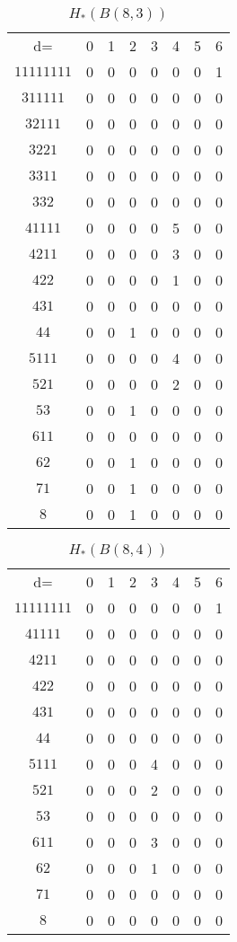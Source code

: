 \documentclass{amsart}
\begin{document}
\begin{table}
\begin{tabular}{cccccccc}
d=         & 0 & 1 & 2 & 3 & 4 & 5 & 6  \\
$11111111$ & 0 & 0 & 0 & 0 & 0 & 0 & 1  \\
$311111$   & 0 & 0 & 0 & 0 & 0 & 0 & 0  \\
$32111$    & 0 & 0 & 0 & 0 & 0 & 0 & 0  \\
$3221$     & 0 & 0 & 0 & 0 & 0 & 0 & 0  \\
$3311$     & 0 & 0 & 0 & 0 & 0 & 0 & 0  \\
$332$      & 0 & 0 & 0 & 0 & 0 & 0 & 0  \\
$41111$    & 0 & 0 & 0 & 0 & 5 & 0 & 0  \\
$4211$     & 0 & 0 & 0 & 0 & 3 & 0 & 0  \\
$422$      & 0 & 0 & 0 & 0 & 1 & 0 & 0  \\
$431$      & 0 & 0 & 0 & 0 & 0 & 0 & 0  \\
$44$       & 0 & 0 & 1 & 0 & 0 & 0 & 0  \\
$5111$     & 0 & 0 & 0 & 0 & 4 & 0 & 0  \\
$521$      & 0 & 0 & 0 & 0 & 2 & 0 & 0  \\
$53$       & 0 & 0 & 1 & 0 & 0 & 0 & 0  \\
$611$      & 0 & 0 & 0 & 0 & 0 & 0 & 0  \\
$62$       & 0 & 0 & 1 & 0 & 0 & 0 & 0  \\
$71$       & 0 & 0 & 1 & 0 & 0 & 0 & 0  \\
$8$        & 0 & 0 & 1 & 0 & 0 & 0 & 0  \\
\end{tabular}
\caption{$H_*(B(8,3))$}
\label{T:8_3}
\end{table}

\begin{table}
\begin{tabular}{cccccccc}
d= & 0 & 1 & 2 & 3 & 4 & 5 & 6  \\
$11111111$ & 0 & 0 & 0 & 0 & 0 & 0 & 1  \\
$41111$    & 0 & 0 & 0 & 0 & 0 & 0 & 0  \\
$4211$     & 0 & 0 & 0 & 0 & 0 & 0 & 0  \\
$422$      & 0 & 0 & 0 & 0 & 0 & 0 & 0  \\
$431$      & 0 & 0 & 0 & 0 & 0 & 0 & 0  \\
$44$       & 0 & 0 & 0 & 0 & 0 & 0 & 0  \\
$5111$     & 0 & 0 & 0 & 4 & 0 & 0 & 0  \\
$521$      & 0 & 0 & 0 & 2 & 0 & 0 & 0  \\
$53$       & 0 & 0 & 0 & 0 & 0 & 0 & 0  \\
$611$      & 0 & 0 & 0 & 3 & 0 & 0 & 0  \\
$62$       & 0 & 0 & 0 & 1 & 0 & 0 & 0  \\
$71$       & 0 & 0 & 0 & 0 & 0 & 0 & 0  \\
$8$        & 0 & 0 & 0 & 0 & 0 & 0 & 0  \\
\end{tabular}
\caption[$H_*(B(8,4))$]{$H_*(B(8, 4))$}
\label{T:8_4}
\end{table}
\end{document}
